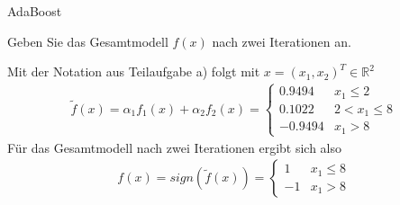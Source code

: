 \begin{task}[credit=15]{AdaBoost}
\begin{subtask}[title=Algorithmus,points=12]
\begin{solution}
\end{solution}

\end{subtask}

\begin{subtask}[title=Gesamtmodell,points=3]
 Geben Sie das Gesamtmodell $f(x)$ nach zwei Iterationen an.
 
\begin{solution}
Mit der Notation aus Teilaufgabe a) folgt mit $x = (x_1, x_2)^T \in \mathbb{R}^2$ \begin{align*}
\tilde{f}(x) = \alpha_1f_1(x) + \alpha_2f_2(x) = \left\{
\begin{array}{ll}
0.9494 & x_1 \leq 2 \\
0.1022 & 2 < x_1 \leq 8 \\
-0.9494 & x_1 > 8 
\end{array}
\right. 
\end{align*} Für das Gesamtmodell nach zwei Iterationen ergibt sich also \begin{align*}
f(x) = sign(\tilde{f}(x)) = \left\{
\begin{array}{ll}
1 &  x_1 \leq 8 \\
-1 & x_1 > 8 
\end{array}
\right. 
\end{align*}
\end{solution}

\end{subtask}

\end{task}

